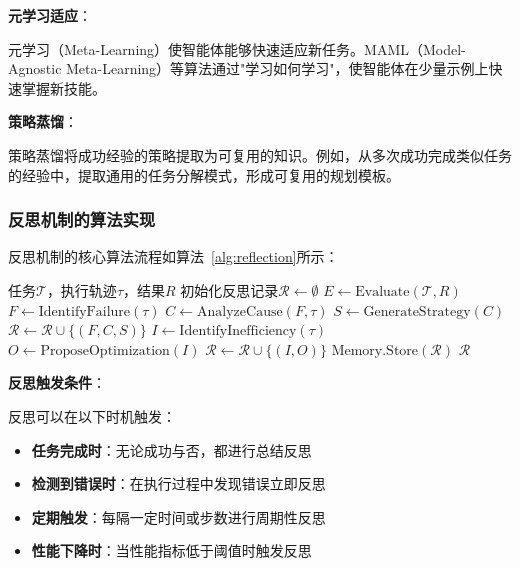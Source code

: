 \textbf{元学习适应}：

元学习（Meta-Learning）使智能体能够快速适应新任务。MAML（Model-Agnostic Meta-Learning）等算法通过"学习如何学习"，使智能体在少量示例上快速掌握新技能。

\textbf{策略蒸馏}：

策略蒸馏将成功经验的策略提取为可复用的知识。例如，从多次成功完成类似任务的经验中，提取通用的任务分解模式，形成可复用的规划模板。

\subsubsection{反思机制的算法实现}

反思机制的核心算法流程如算法~\ref{alg:reflection}所示：

\begin{algorithm}[htbp]
    \caption{反思机制算法流程}
    \label{alg:reflection}
    \begin{algorithmic}[1]
        \Require 任务$\mathcal{T}$，执行轨迹$\tau$，结果$R$
        \State 初始化反思记录$\mathcal{R} \leftarrow \emptyset$
        \State $E \leftarrow \text{Evaluate}(\mathcal{T}, R)$ 
            \State $F \leftarrow \text{IdentifyFailure}(\tau)$ 
            \State $C \leftarrow \text{AnalyzeCause}(F, \tau)$ 
            \State $S \leftarrow \text{GenerateStrategy}(C)$ 
            \State $\mathcal{R} \leftarrow \mathcal{R} \cup \{(F, C, S)\}$
            \State $I \leftarrow \text{IdentifyInefficiency}(\tau)$ 
            \State $O \leftarrow \text{ProposeOptimization}(I)$ 
            \State $\mathcal{R} \leftarrow \mathcal{R} \cup \{(I, O)\}$
        \EndIf
        \State $\text{Memory.Store}(\mathcal{R})$ 
        \State \Return $\mathcal{R}$
    \end{algorithmic}
\end{algorithm}

\textbf{反思触发条件}：

反思可以在以下时机触发：
\begin{itemize}[leftmargin=2em]
    \item \textbf{任务完成时}：无论成功与否，都进行总结反思
    \item \textbf{检测到错误时}：在执行过程中发现错误立即反思
    \item \textbf{定期触发}：每隔一定时间或步数进行周期性反思
    \item \textbf{性能下降时}：当性能指标低于阈值时触发反思
\end{itemize}

